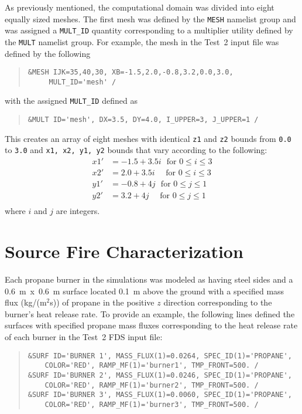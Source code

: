 As previously mentioned, the computational domain was divided into eight equally sized meshes. The first mesh was defined by the \verb|MESH| namelist group and was assigned a \verb|MULT_ID| quantity corresponding to a multiplier utility defined by the \verb|MULT| namelist group. For example, the mesh in the Test~2 input file was defined by the following
\begin{quote}
\begin{verbatim}
&MESH IJK=35,40,30, XB=-1.5,2.0,-0.8,3.2,0.0,3.0, 
     MULT_ID='mesh' / 
\end{verbatim}
\end{quote}
with the assigned \verb|MULT_ID| defined as 
\begin{quote}
\begin{verbatim}
&MULT ID='mesh', DX=3.5, DY=4.0, I_UPPER=3, J_UPPER=1 /
\end{verbatim}
\end{quote}
This creates an array of eight meshes with identical \verb|z1| and \verb|z2| bounds from \verb|0.0| to \verb|3.0| and \verb|x1, x2, y1, y2| bounds that vary according to the following:
\begin{equation*}
\begin{split}
	x1' &= -1.5+3.5i \textrm{~~for~} 0 \leq i \leq 3 \\
	x2' &= 2.0+3.5i \textrm{~~~~for~} 0 \leq i \leq 3 \\
	y1' &= -0.8+4j \textrm{~~for~} 0 \leq j \leq 1 \\
	y2' &= 3.2+4j \textrm{~~~~for~} 0 \leq j \leq 1 \\
\end{split}
\end{equation*}
where $i$ and $j$ are integers.

\section{Source Fire Characterization}
Each propane burner in the simulations was modeled as having steel sides and a 0.6~m~x~0.6~m surface located 0.1~m above the ground with a specified mass flux (kg/(m$^2$s)) of propane in the positive $z$ direction corresponding to the burner's heat release rate. To provide an example, the following lines defined the surfaces with specified propane mass fluxes corresponding to the heat release rate of each burner in the Test~2 FDS input file: 
\begin{quote}
\begin{verbatim}
&SURF ID='BURNER 1', MASS_FLUX(1)=0.0264, SPEC_ID(1)='PROPANE', 
    COLOR='RED', RAMP_MF(1)='burner1', TMP_FRONT=500. /
&SURF ID='BURNER 2', MASS_FLUX(1)=0.0246, SPEC_ID(1)='PROPANE', 
    COLOR='RED', RAMP_MF(1)='burner2', TMP_FRONT=500. /
&SURF ID='BURNER 3', MASS_FLUX(1)=0.0060, SPEC_ID(1)='PROPANE', 
    COLOR='RED', RAMP_MF(1)='burner3', TMP_FRONT=500. /
\end{verbatim}
\end{quote}

